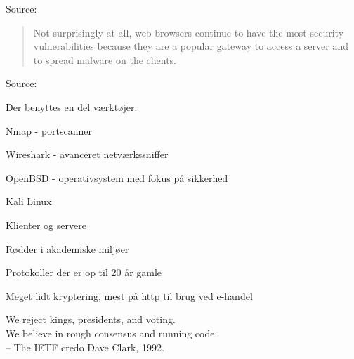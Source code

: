 \documentclass[20pt,landscape,a4paper]{foils}
\begin{document}
Source:\\
{\footnotesize
{}}




\begin{quote}\small
Not surprisingly at all, web browsers continue to have the most security vulnerabilities because they are a popular gateway to access a server and to spread malware on the clients.
\end{quote}

Source:\\
{\footnotesize
{}}




\begin{list1}
\item Der benyttes en del værktøjer:
\begin{list2}
\item Nmap -  portscanner
\item Wireshark -  avanceret netværkssniffer
\item OpenBSD -  operativsystem med fokus
  på sikkerhed
\item Kali Linux 
\end{list2}

\end{list1}




\begin{list1}
\item Klienter og servere
\item Rødder i akademiske miljøer
\item Protokoller der er op til 20 år gamle
\item Meget lidt kryptering, mest på http til brug ved e-handel
\end{list1}


{\hlkbig
We reject kings, presidents, and voting.\\
We believe in rough consensus and running code.\\
-- The IETF credo Dave Clark, 1992.}
\end{document}
